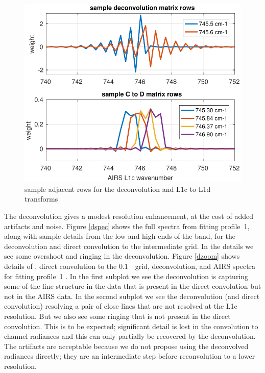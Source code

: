 \documentclass[10pt,twocolumn]{article}
\begin{document}
\begin{figure} %
  \centering
  \includegraphics[width=\linewidth]{figures/airs_decon_basis.pdf}
  \caption{sample adjacent rows for the deconvolution and L1c to L1d
    transforms}
  \label{dbasis}
\end{figure}

The {\airs} deconvolution gives a modest resolution enhancement, at
the cost of added artifacts and noise.  Figure \ref{dspec} shows the
full spectra from fitting profile~1, along with sample details from
the low and high ends of the band, for the deconvolution and direct
convolution to the intermediate grid.  In the details we see some
overshoot and ringing in the deconvolution.  Figure \ref{dzoom}
shows details of {\kcarta}, direct convolution to the
$0.1$~\wn\ grid, deconvolution, and AIRS spectra for fitting
profile~1 \cite{sarta1,sarta2}.  In the first subplot we see the
deconvolution is capturing some of the fine structure in the
{\kcarta} data that is present in the direct convolution but not in
the AIRS data.  In the second subplot we see the deconvolution (and
direct convolution) resolving a pair of close lines that are not
resolved at the {\airs} L1c resolution.  But we also see some
ringing that is not present in the direct convolution.  This is to
be expected; significant detail is lost in the convolution to
{\airs} channel radiances and this can only partially be recovered
by the deconvolution.  The artifacts are acceptable because we do
not propose using the deconvolved radiances directly; they are an
intermediate step before reconvolution to a lower resolution.
\end{document}
